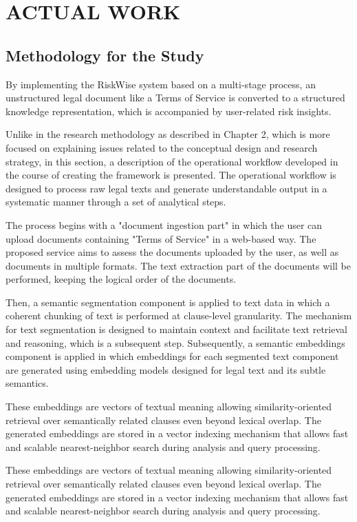 \chapter{ACTUAL WORK} %
\label{ChapterActualWork} %

\section{Methodology for the Study}
By implementing the RiskWise system based on a multi-stage process,
an unstructured legal document like a Terms of Service is converted
to a structured knowledge representation, which is accompanied by
user-related risk insights. 

Unlike in the research methodology as described in Chapter 2, which is more focused on explaining issues related
to the conceptual design and research strategy, in this section, a description of the operational workflow
developed in the course of creating the framework is presented.
The operational workflow is designed to process raw legal texts and generate understandable output in a
systematic manner through a set of analytical steps.

The process begins with a "document ingestion part" in which the user can upload documents containing "Terms of Service" in a web-based way.
The proposed service aims to assess the documents uploaded by the user, as well as documents in multiple formats.
The text extraction part of the documents will be performed, keeping the logical order of the documents.

Then, a semantic segmentation component is applied to text data in which a coherent chunking of text is
performed at clause-level granularity.
The mechanism for text segmentation is designed to maintain context and facilitate text retrieval and
reasoning, which is a subsequent step.
Subsequently, a semantic embeddings component is applied in which embeddings for each segmented text
component are generated using embedding models designed for legal text and its subtle semantics. 

These embeddings are vectors of textual
meaning allowing similarity-oriented retrieval over semantically
related clauses even beyond lexical overlap. The generated embeddings
are stored in a vector indexing mechanism that allows fast and
scalable nearest-neighbor search during analysis and query processing.

These embeddings are vectors of textual
meaning allowing similarity-oriented retrieval over semantically
related clauses even beyond lexical overlap. The generated embeddings
are stored in a vector indexing mechanism that allows fast and
scalable nearest-neighbor search during analysis and query processing.


